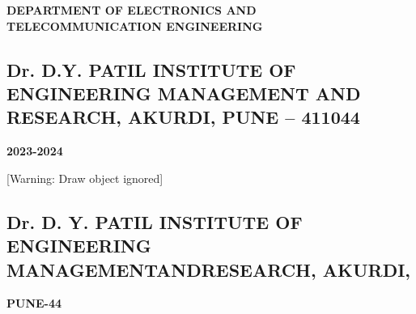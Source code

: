 \documentclass[letterpaper]{article}
\begin{document}
\bigskip


\bigskip

{\centering
\textbf{\textcolor[rgb]{0.0,0.43529412,0.7529412}{DEPARTMENT OF ELECTRONICS AND TELECOMMUNICATION ENGINEERING}}
\par}


\bigskip


\bigskip


\bigskip


\bigskip


\bigskip


\bigskip


\bigskip


\bigskip


\bigskip


\bigskip


\bigskip


\bigskip


\bigskip


\bigskip

\subsection[Dr. D.Y. PATIL INSTITUTE OF ENGINEERING MANAGEMENT AND RESEARCH, AKURDI, PUNE {}--
411044]{\textcolor[rgb]{0.0,0.12156863,0.37254903}{Dr. D.Y. PATIL INSTITUTE OF ENGINEERING MANAGEMENT AND RESEARCH,
AKURDI, PUNE -- 411044}}
{\centering
\textbf{\textcolor[rgb]{0.0,0.12156863,0.37254903}{2023-2024}}
\par}

[Warning: Draw object ignored]

\clearpage\setcounter{page}{1}\pagestyle{Convertedi}
\subsection[Dr. D. Y. PATIL INSTITUTE OF ENGINEERING MANAGEMENTANDRESEARCH,
AKURDI,]{\textcolor[rgb]{0.0,0.12156863,0.37254903}{Dr. D. Y. PATIL INSTITUTE OF ENGINEERING MANAGEMENTANDRESEARCH,
AKURDI,}}
{\centering
\textbf{\textcolor[rgb]{0.0,0.12156863,0.37254903}{PUNE-44}}
\par}


\bigskip


\bigskip


\bigskip


\bigskip


\bigskip


\bigskip


\bigskip


\bigskip
\end{document}
